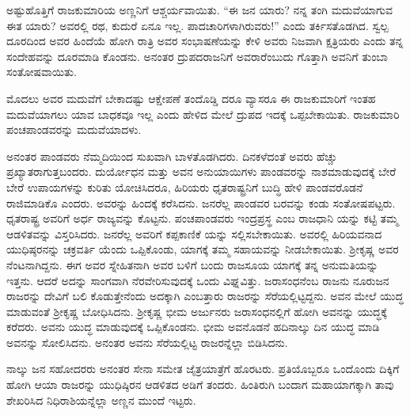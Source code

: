 ಅಷ್ಟುಹೊತ್ತಿಗೆ ರಾಜಕುಮಾರಿಯ ಅಣ್ಣನಿಗೆ ಆಶ್ಚರ್ಯವಾಯಿತು. “ಈ ಜನ ಯಾರು? ನನ್ನ ತಂಗಿ ಮದುವೆಯಾಗುವ ಈತ ಯಾರು? ಅವರಲ್ಲಿ ರಥ, ಕುದುರೆ ಏನೂ ಇಲ್ಲ. ಪಾದಚಾರಿಗಳಾಗಿರುವರು!” ಎಂದು ತರ್ಕಿಸತೊಡಗಿದ. ಸ್ವಲ್ಪ ದೂರದಿಂದ ಅವರ ಹಿಂದೆಯೆ ಹೋಗಿ ರಾತ್ರಿ ಅವರ ಸಂಭಾಷಣೆಯನ್ನು ಕೇಳಿ ಅವರು ನಿಜವಾಗಿ ಕ್ಷತ್ರಿಯರು ಎಂದು ತನ್ನ ಸಂದೇಹವನ್ನು ದೂರಮಾಡಿ ಕೊಂಡನು. ಅನಂತರ ದ್ರುಪದರಾಜನಿಗೆ ಅವರಾರೆಂಬುದು ಗೊತ್ತಾಗಿ ಅವನಿಗೆ ತುಂಬಾ ಸಂತೋಷವಾಯಿತು.

ಮೊದಲು ಅವರ ಮದುವೆಗೆ ಬೇಕಾದಷ್ಟು ಆಕ್ಷೇಪಣೆ ತಂದೊಡ್ಡಿ ದರೂ ವ್ಯಾಸರೂ ಈ ರಾಜಕುಮಾರಿಗೆ ಇಂತಹ ಮದುವೆಯಾಗಲು ಯಾವ ಬಾಧಕವೂ ಇಲ್ಲ ಎಂದು ಹೇಳಿದ ಮೇಲೆ ದ್ರುಪದ ಇದಕ್ಕೆ ಒಪ್ಪಬೇಕಾಯಿತು. ರಾಜಕುಮಾರಿ ಪಂಚಪಾಂಡವರನ್ನು ಮದುವೆಯಾದಳು.

ಅನಂತರ ಪಾಂಡವರು ನೆಮ್ಮದಿಯಿಂದ ಸುಖವಾಗಿ ಬಾಳತೊಡಗಿದರು. ದಿನಕಳೆದಂತೆ ಅವರು ಹೆಚ್ಚು ಪ್ರಖ್ಯಾತರಾಗುತ್ತಬಂದರು. ದುರ್ಯೋಧನ ಮತ್ತು ಅವನ ಅನುಯಾಯಿಗಳು ಪಾಂಡವರನ್ನು ನಾಶಮಾಡುವುದಕ್ಕೆ ಬೇರೆ ಬೇರೆ ಉಪಾಯಗಳನ್ನು ಕುರಿತು ಯೋಚಿಸಿದರೂ, ಹಿರಿಯರು ಧೃತರಾಷ್ಟ್ರನಿಗೆ ಬುದ್ಧಿ ಹೇಳಿ ಪಾಂಡವರೊಡನೆ ರಾಜಿಮಾಡಿಕೊ ಎಂದರು. ಅವರನ್ನು ಹಿಂದಕ್ಕೆ ಕರೆಸಿದನು. ಜನರೆಲ್ಲ ಪಾಂಡವರ ಬರವನ್ನು ಕಂಡು ಸಂತೋಷಪಟ್ಟರು. ಧೃತರಾಷ್ಟ್ರ ಅವರಿಗೆ ಅರ್ಧ ರಾಜ್ಯವನ್ನು ಕೊಟ್ಟನು. ಪಂಚಪಾಂಡವರು ಇಂದ್ರಪ್ರಸ್ಥ ಎಂಬ ರಾಜಧಾನಿ ಯನ್ನು ಕಟ್ಟಿ ತಮ್ಮ ಆಡಳಿತವನ್ನು ವಿಸ್ತರಿಸಿದರು. ಜನರೆಲ್ಲ ಅವರಿಗೆ ಕಪ್ಪಕಾಣಿಕೆ ಯನ್ನು ಸಲ್ಲಿಸಬೇಕಾಯಿತು. ಅವರಲ್ಲಿ ಹಿರಿಯವನಾದ ಯುಧಿಷ್ಠರನನ್ನು ಚಕ್ರವರ್ತಿ ಯೆಂದು ಒಪ್ಪಿಕೊಂಡು, ಯಾಗಕ್ಕೆ ತಮ್ಮ ಸಹಾಯವನ್ನು ನೀಡಬೇಕಾಯಿತು. ಶ‍್ರೀಕೃಷ್ಣ ಅವರ ನೆಂಟನಾಗಿದ್ದನು. ಈಗ ಅವರ ಸ್ನೇಹಿತನಾಗಿ ಅವರ ಬಳಿಗೆ ಬಂದು ರಾಜಸೂಯ ಯಾಗಕ್ಕೆ ತನ್ನ ಅನುಮತಿಯನ್ನು ಇತ್ತನು. ಆದರೆ ಅದನ್ನು ಸಾಂಗವಾಗಿ ನೆರವೇರಿಸುವುದಕ್ಕೆ ಒಂದು ವಿಘ್ನವಿತ್ತು. ಜರಾಸಂಧನೆಂಬ ರಾಜನು ನೂರುಜನ ರಾಜರನ್ನು ದೇವಿಗೆ ಬಲಿ ಕೊಡುತ್ತೇನೆಂದು ಅದಕ್ಕಾಗಿ ಎಂಬತ್ತಾರು ರಾಜರನ್ನು ಸೆರೆಯಲ್ಲಿಟ್ಟದ್ದನು. ಅವನ ಮೇಲೆ ಯುದ್ಧ ಮಾಡುವಂತೆ ಶ‍್ರೀಕೃಷ್ಣ ಬೋಧಿಸಿದನು. ಶ‍್ರೀಕೃಷ್ಣ ಭೀಮ ಅರ್ಜುನರು ಜರಾಸಂಧನಲ್ಲಿಗೆ ಹೋಗಿ ಅವನನ್ನು ಯುದ್ಧಕ್ಕೆ ಕರೆದರು. ಅವನು ಯುದ್ಧ ಮಾಡುವುದಕ್ಕೆ ಒಪ್ಪಿಕೊಂಡನು. ಭೀಮ ಅವನೊಡನೆ ಹದಿನಾಲ್ಕು ದಿನ ಯುದ್ಧ ಮಾಡಿ ಅವನನ್ನು ಸೋಲಿಸಿದನು. ಅನಂತರ ಅವನು ಸೆರೆಯಲ್ಲಿಟ್ಟ ರಾಜರನ್ನೆಲ್ಲಾ ಬಿಡಿಸಿದನು.

ನಾಲ್ಕು ಜನ ಸಹೋದರರು ಅನಂತರ ಸೇನಾ ಸಮೇತ ಜೈತ್ರಯಾತ್ರೆಗೆ ಹೊರಟರು. ಪ್ರತಿಯೊಬ್ಬರೂ ಒಂದೊಂದು ದಿಕ್ಕಿಗೆ ಹೋಗಿ ಆಯಾ ರಾಜರನ್ನು ಯುಧಿಷ್ಠಿರನ ಆಡಳಿತದ ಅಡಿಗೆ ತಂದರು. ಹಿಂತಿರುಗಿ ಬಂದಾಗ ಮಹಾಯಾಗಕ್ಕಾಗಿ ತಾವು ಶೇಖರಿಸಿದ ನಿಧಿರಾಶಿಯನ್ನೆಲ್ಲಾ ಅಣ್ಣನ ಮುಂದೆ ಇಟ್ಟರು.

